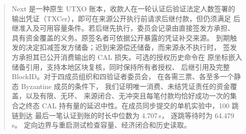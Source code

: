 \begin{abstract}
Next 是一种原生 UTXO 账本，收款人在一轮认证后验证法定人数签署的
输出凭证（TXCer），即可在来源公开执行前请求后继付款，但仍须满足
后继准入及可用容量条件。若后继先执行，委员会记录由直接签发方承担、
具有资金覆盖的义务。原签名者可依据公开暴露的凭证补交来源。
到期触发的决定扣减签发方储备；迟到来源偿还储备，而来源永不执行时，
签发方承担其已公开消费输出的 CAL 损失。可选的授权历史命令在
原坐标嵌入储备引用，支持本地区块复核，同时保持所有者授权、
后继引用及完整 BlockID。对于四成员组织和四验证者委员会，
在各需三票、各至多一个静态 Byzantine 成员的条件下，
我们证明唯一消费、未结凭证责任的资金覆盖，以及有限、无环、
来源闭合、无冲突且每笔付款均恰好成功一次的集合之终态 CAL
持有量的延迟中性。在成员同步提交的单机实验中，100 跳链到达
最后一笔认证到账的时长中位数为 4.707\,s，
逐跳等待时为 64.479\,s。
定向边界与重启测试检查容量、经济闭合和历史读取。
\end{abstract}